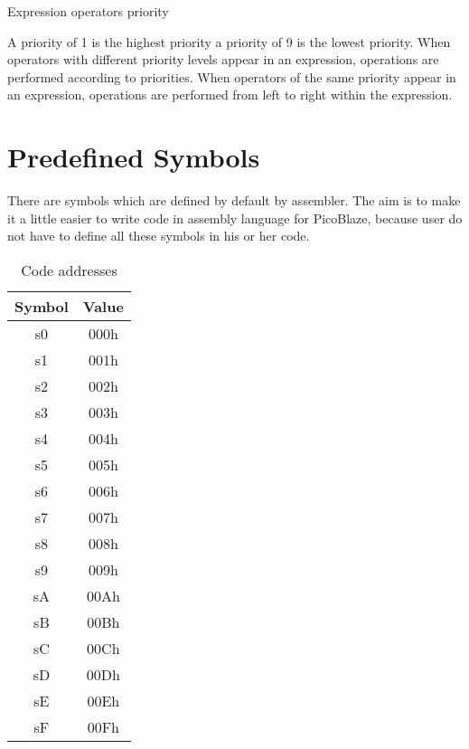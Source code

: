 \begin{table}[h!]
        \caption{Expression operators priority}
    \end{table}

    A priority of 1 is the highest priority a priority of 9 is the lowest priority. When operators with different priority levels appear in an expression, operations are performed according to priorities. When operators of the same priority appear in an expression, operations are performed from left to right within the expression.

\section{Predefined Symbols}
    There are symbols which are defined by default by assembler. The aim is to make it a little easier to write code in assembly language for PicoBlaze, because user do not have to define all these symbols in his or her code.

    \begin{table}[h!]
        \centering{}
        \mysmallfont{}

        \begin{tabular}{|cc|}
            \hline
            Symbol & Value \\\hline
            s0     & 000h  \\\hline
            s1     & 001h  \\\hline
            s2     & 002h  \\\hline
            s3     & 003h  \\\hline
            s4     & 004h  \\\hline
            s5     & 005h  \\\hline
            s6     & 006h  \\\hline
            s7     & 007h  \\\hline
            s8     & 008h  \\\hline
            s9     & 009h  \\\hline
            sA     & 00Ah  \\\hline
            sB     & 00Bh  \\\hline
            sC     & 00Ch  \\\hline
            sD     & 00Dh  \\\hline
            sE     & 00Eh  \\\hline
            sF     & 00Fh  \\\hline
        \end{tabular}

        \caption{Code addresses}
    \end{table}

